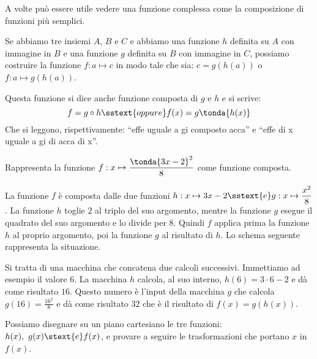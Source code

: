 A volte può essere utile vedere una funzione complessa come la 
composizione di funzioni più semplici. 

Se abbiamo tre insiemi \(A\), \(B\) e \(C\) e abbiamo una funzione \(h\) 
definita su \(A\) con immagine in \(B\) e una funzione \(g\) definita su 
\(B\) con immagine in \(C\), possiamo costruire la funzione 
\(f: a \mapsto c\) in modo tale che sia: 
\(c=g(h(a))\) o \(f: a \mapsto g(h(a))\).

\begin{center}
\end{center}

Questa funzione si dice anche funzione composta di \(g\) e \(h\) e si scrive:
\[f = g \circ h \sstext{oppure} f(x) = g \tonda{h(x)}\]
Che si leggono, rispettivamente: ``effe uguale a gi composto acca''
e ``effe di x uguale a gi di acca di x''.

\begin{esempio}
Rappresenta la funzione  \(f: x \mapsto \dfrac{\tonda{3x -2}^2}{8}\)
come funzione composta. 

La funzione \(f\) è composta dalle due funzioni 
\(h: x \mapsto 3x -2 \sstext{e} g: x \mapsto \dfrac{x^2}{8}\). \quad 
La funzione 
\(h\) toglie \(2\) al triplo del suo argomento, mentre la funzione 
\(g\) esegue il quadrato del suo argomento e lo divide per \(8\).
Quindi \(f\) applica prima la funzione \(h\) al proprio argomento, poi la 
funzione \(g\) al risultato di \(h\).
Lo schema seguente rappresenta la situazione.

\hspace{5mm}\scalebox{.8}{\boxfunzionecompostaa} 
\label{gra:differenziazione_boxcompostaa}

Si tratta di una macchina che concatena due calcoli successivi. 
Immettiamo ad esempio il valore \(6\). 
La macchina \(h\) calcola, al suo interno, \(h(6)=3\cdot 6-2\) e dà come 
risultato \(16\).
Questo numero è l'input della macchina \(g\) che calcola 
\(g(16)=\frac{16^2}{8}\) e dà come risultato \(32\)
che è il risultato di \(f(x) = g(h(x))\).

Possiamo disegnare su un piano cartesiano le tre funzioni: 
\(h(x),~g(x) \stext{e} f(x)\), e provare a seguire le trasformazioni che 
portano \(x\) in \(f(x)\).

\end{esempio}

